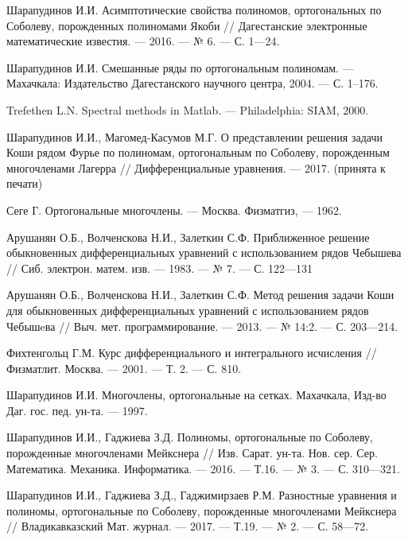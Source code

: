 \begin{thebibliography}{111}
{Шарапудинов И.И.}
Асимптотические свойства полиномов, ортогональных по Соболеву, порожденных полиномами Якоби // Дагестанские электронные математические известия. --- 2016. --- № 6. --- С. 1---24.


{Шарапудинов И.И.}
Смешанные ряды по ортогональным полиномам. --- Махачкала: Издательство Дагестанского научного центра, 2004. --- С. 1--176.


{Trefethen L.N.}
Spectral methods in Matlab. --- Philadelphia: SIAM, 2000.


{Шарапудинов И.И., Магомед-Касумов М.Г.}
О представлении решения задачи Коши  рядом Фурье  по полиномам, ортогональным по  Соболеву, порожденным многочленами Лагерра // Дифференциальные уравнения. --- 2017. (принята к печати)








Сеге Г. Ортогональные многочлены. --- Москва. Физматгиз, --- 1962.


{Арушанян О.Б., Волченскова Н.И., Залеткин С.Ф.}
Приближенное решение обыкновенных дифференциальных уравнений с использованием рядов Чебышева // Сиб. электрон. матем. изв. --- 1983. --- № 7. --- С. 122---131


{Арушанян О.Б., Волченскова Н.И., Залеткин С.Ф.}
 Метод решения задачи Коши для обыкновенных дифференциальных уравнений с использованием рядов Чебышeва // Выч. мет. программирование. --- 2013. --- № 14:2. --- С. 203---214.


{Фихтенгольц Г.М.}
Курс дифференциального и интегрального исчисления // Физматлит. Москва. --- 2001. --- Т. 2. --- С. 810.


{Шарапудинов И.И.} Многочлены, ортогональные на сетках. Махачкала, Изд-во Даг. гос. пед. ун-та. --- 1997.		


{Шарапудинов И.И., Гаджиева З.Д.}
Полиномы, ортогональные по Соболеву, порожденные многочленами Мейкснера // Изв. Сарат. ун-та. Нов. сер. Сер. Математика. Механика. Информатика. ---
2016. --- Т.16. --- № 3. --- С. 310---321.


{Шарапудинов И.И., Гаджиева З.Д., Гаджимирзаев Р.М.}
Разностные уравнения и полиномы, ортогональные по Соболеву, порожденные многочленами Мейкснера //
Владикавказский Мат. журнал. --- 2017. --- Т.19. --- № 2. --- С. 58---72.



\end{thebibliography}
